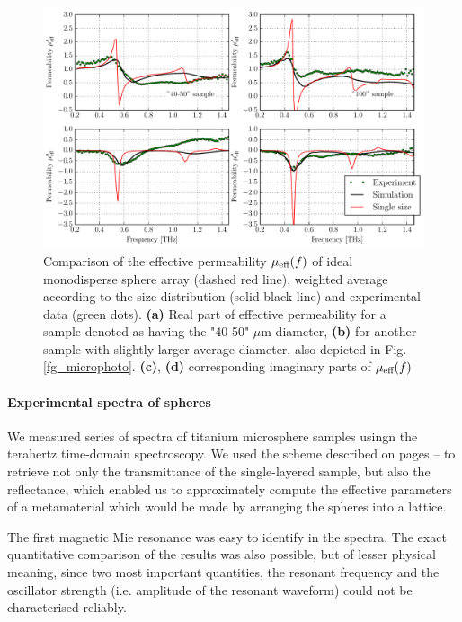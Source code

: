  \begin{figure}[ht]   %
	 \caption[Comparison of the effective permeability $\meff(f)$ of ideal monodisperse sphere array, weighted average according to the size distribution and experimental data]{Comparison of the effective permeability $\meff(f)$ of ideal monodisperse sphere array (dashed red line), weighted average according to the size distribution (solid black line) and experimental data (green dots). \textbf{(a)} Real part of effective permeability for a sample denoted as having the "40-50" $\mu$m diameter, \textbf{(b)} for another sample with slightly larger average diameter, also depicted in Fig. \ref{fg_microphoto}. \textbf{(c)}, \textbf{(d)} corresponding imaginary parts of $\meff(f)$}
\label{fg_mm2012_convolution} \centering 
\includegraphics[width=\textwidth]{img-expe/sphere_convolution/mm2012_convolution.pdf}
\end{figure}
\paragraph{Experimental spectra of spheres} %
We measured series of spectra of titanium microsphere samples usingn the terahertz time-domain spectroscopy. We used the scheme described on pages \pageref{srtm}--\pageref{srtm2} to retrieve not only the transmittance of the single-layered sample, but also the reflectance, which enabled us to approximately compute the effective parameters of a metamaterial which would be made by arranging the spheres into a lattice. 

The first magnetic Mie resonance was easy to identify in the spectra. The exact quantitative comparison of the results was also possible, but of lesser physical meaning, since two most important quantities, the resonant frequency and the oscillator strength (i.e. amplitude of the resonant waveform) could not be characterised reliably. 

